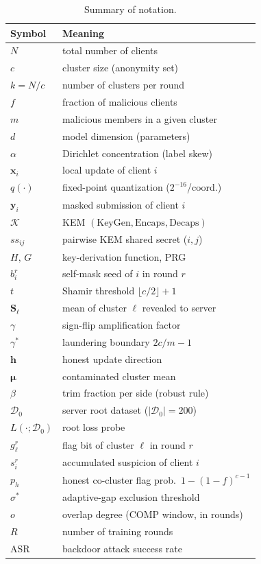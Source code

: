 \documentclass[lettersize,journal]{IEEEtran}
\begin{document}
\begin{table}[t]
\caption{Summary of notation.}
\label{tab:notation}
\centering
\footnotesize
\setlength{\tabcolsep}{5pt}
\renewcommand{\arraystretch}{1.15}
\begin{tabular}{@{}ll@{}}
\toprule
Symbol & Meaning \\
\midrule
$N$ & total number of clients \\
$c$ & cluster size (anonymity set) \\
$k=N/c$ & number of clusters per round \\
$f$ & fraction of malicious clients \\
$m$ & malicious members in a given cluster \\
$d$ & model dimension (parameters) \\
$\alpha$ & Dirichlet concentration (label skew) \\
$\mathbf{x}_i$ & local update of client $i$ \\
$q(\cdot)$ & fixed-point quantization ($2^{-16}$/coord.) \\
$\mathbf{y}_i$ & masked submission of client $i$ \\
$\mathcal{K}$ & KEM $(\mathrm{KeyGen},\mathrm{Encaps},\mathrm{Decaps})$ \\
$ss_{ij}$ & pairwise KEM shared secret ($i,j$) \\
$H,\,G$ & key-derivation function, PRG \\
$b_i^r$ & self-mask seed of $i$ in round $r$ \\
$t$ & Shamir threshold $\lfloor c/2\rfloor+1$ \\
$\mathbf{S}_\ell$ & mean of cluster $\ell$ revealed to server \\
$\gamma$ & sign-flip amplification factor \\
$\gamma^{\!*}$ & laundering boundary $2c/m-1$ \\
$\mathbf{h}$ & honest update direction \\
$\boldsymbol{\mu}$ & contaminated cluster mean \\
$\beta$ & trim fraction per side (robust rule) \\
$\mathcal{D}_0$ & server root dataset ($|\mathcal{D}_0|{=}200$) \\
$L(\cdot;\mathcal{D}_0)$ & root loss probe \\
$g_\ell^r$ & flag bit of cluster $\ell$ in round $r$ \\
$s_i^r$ & accumulated suspicion of client $i$ \\
$p_h$ & honest co-cluster flag prob.\ $1-(1-f)^{c-1}$ \\
$\sigma^{*}$ & adaptive-gap exclusion threshold \\
$o$ & overlap degree (COMP window, in rounds) \\
$R$ & number of training rounds \\
ASR & backdoor attack success rate \\
\bottomrule
\end{tabular}
\end{table}
\end{document}
